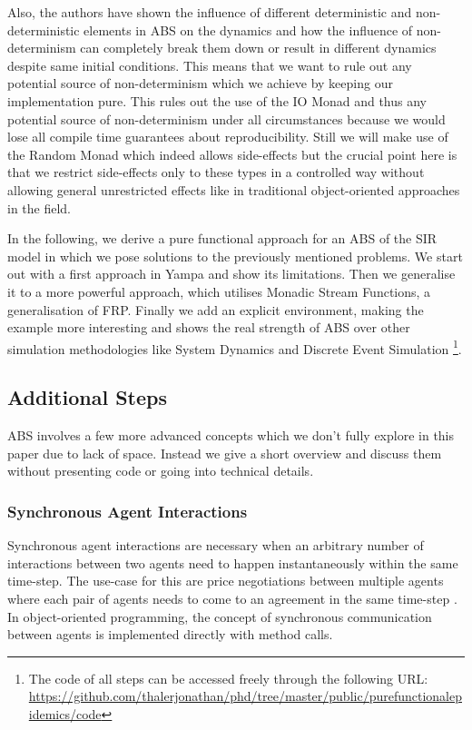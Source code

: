Also, the authors \cite{thaler_art_2017} have shown the influence of different deterministic and non-deterministic elements in ABS on the dynamics and how the influence of non-determinism can completely break them down or result in different dynamics despite same initial conditions. This means that we want to rule out any potential source of non-determinism which we achieve by keeping our implementation pure. This rules out the use of the IO Monad and thus any potential source of non-determinism under all circumstances because we would lose all compile time guarantees about reproducibility. Still we will make use of the Random Monad which indeed allows side-effects but the crucial point here is that we restrict side-effects only to these types in a controlled way without allowing general unrestricted effects like in traditional object-oriented approaches in the field.

In the following, we derive a pure functional approach for an ABS of the SIR model in which we pose solutions to the previously mentioned problems. We start out with a first approach in Yampa and show its limitations. Then we generalise it to a more powerful approach, which utilises Monadic Stream Functions, a generalisation of FRP. Finally we add an explicit environment, making the example more interesting and shows the real strength of ABS over other simulation methodologies like System Dynamics and Discrete Event Simulation \footnote{The code of all steps can be accessed freely through the following URL: \url{https://github.com/thalerjonathan/phd/tree/master/public/purefunctionalepidemics/code}}.







\subsection{Additional Steps}
ABS involves a few more advanced concepts which we don't fully explore in this paper due to lack of space. Instead we give a short overview and discuss them without presenting code or going into technical details.

\subsubsection{Synchronous Agent Interactions}
Synchronous agent interactions are necessary when an arbitrary number of interactions between two agents need to happen instantaneously within the same time-step. The use-case for this are price negotiations between multiple agents where each pair of agents needs to come to an agreement in the same time-step \cite{epstein_growing_1996}. In object-oriented programming, the concept of synchronous communication between agents is implemented directly with method calls.

